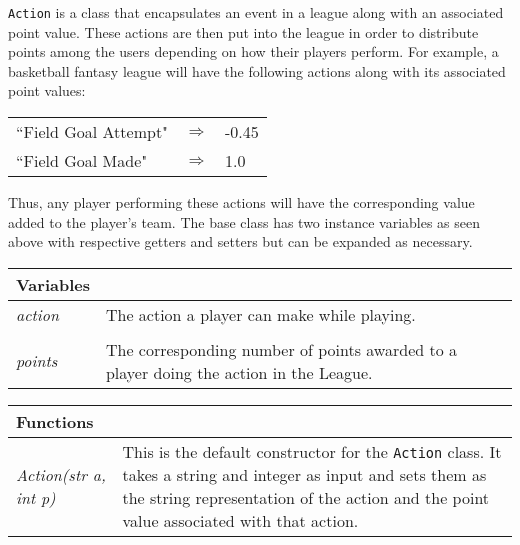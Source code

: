 \documentclass[12pt]{report}
\begin{document}
\texttt{Action} is a class that encapsulates an event in a league along with an associated point value. These actions are then put into the league in order to distribute points among the users depending on how their players perform. For example, a basketball fantasy league will have the following actions along with its associated point values:
\begin{center}
\begin{singlespace}
\begin{tabular}{ l c l }
``Field Goal Attempt" & $\Rightarrow$ & -0.45 \\
``Field Goal Made" & $\Rightarrow$ & 1.0
\end{tabular}
\end{singlespace}
\end{center}

Thus, any player performing these actions will have the corresponding value added to the player's team. The base class has two instance variables as seen above with respective getters and setters but can be expanded as necessary.

\begin{flushleft}
\begin{singlespace}
\begin{tabular}{ p{3.5cm} | p{12cm} }
\hline
\textbf{Variables} & \\
\hline
\textit{action} & The action a player can make while playing. \\
\\
\textit{points} & The corresponding number of points awarded to a player doing the action in the League. \\
\end{tabular}
\end{singlespace}
\end{flushleft}

\begin{flushleft}
\begin{singlespace}
\begin{tabular}{ l | p{12cm} }
\hline
\textbf{Functions} & \\
\hline
\textit{Action(str a, int p)} & This is the default constructor for the \texttt{Action} class. It takes a string and integer as input and sets them as the string representation of the action and the point value associated with that action. \\
\hline
\end{tabular}
\end{singlespace}
\end{flushleft}
\end{document}

